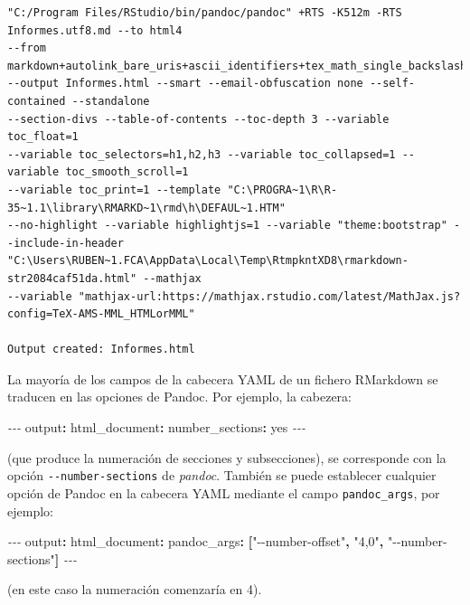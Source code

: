 \documentclass[
]{book}
\newenvironment{Shaded}{\begin{snugshade}}{\end{snugshade}}
\newcommand{\AttributeTok}[1]{\textcolor[rgb]{0.77,0.63,0.00}{#1}}
\newcommand{\CharTok}[1]{\textcolor[rgb]{0.31,0.60,0.02}{#1}}
\newcommand{\FunctionTok}[1]{\textcolor[rgb]{0.00,0.00,0.00}{#1}}
\newcommand{\KeywordTok}[1]{\textcolor[rgb]{0.13,0.29,0.53}{\textbf{#1}}}
\newcommand{\PreprocessorTok}[1]{\textcolor[rgb]{0.56,0.35,0.01}{\textit{#1}}}
\newcommand{\StringTok}[1]{\textcolor[rgb]{0.31,0.60,0.02}{#1}}
\theoremstyle{break}
\theoremstyle{nonumberplain}
\begin{document}
\begin{verbatim}
"C:/Program Files/RStudio/bin/pandoc/pandoc" +RTS -K512m -RTS Informes.utf8.md --to html4 
--from markdown+autolink_bare_uris+ascii_identifiers+tex_math_single_backslash 
--output Informes.html --smart --email-obfuscation none --self-contained --standalone 
--section-divs --table-of-contents --toc-depth 3 --variable toc_float=1 
--variable toc_selectors=h1,h2,h3 --variable toc_collapsed=1 --variable toc_smooth_scroll=1 
--variable toc_print=1 --template "C:\PROGRA~1\R\R-35~1.1\library\RMARKD~1\rmd\h\DEFAUL~1.HTM"
--no-highlight --variable highlightjs=1 --variable "theme:bootstrap" --include-in-header
"C:\Users\RUBEN~1.FCA\AppData\Local\Temp\RtmpkntXD8\rmarkdown-str2084caf51da.html" --mathjax 
--variable "mathjax-url:https://mathjax.rstudio.com/latest/MathJax.js?config=TeX-AMS-MML_HTMLorMML"

Output created: Informes.html
\end{verbatim}

La mayoría de los campos de la cabecera YAML de un fichero RMarkdown se traducen en las opciones de Pandoc.
Por ejemplo, la cabezera:

\begin{Shaded}
\begin{Highlighting}[]
\PreprocessorTok{{-}{-}{-}}
\FunctionTok{output}\KeywordTok{:}
\AttributeTok{  }\FunctionTok{html\_document}\KeywordTok{:}
\AttributeTok{    }\FunctionTok{number\_sections}\KeywordTok{:}\AttributeTok{ }\CharTok{yes}\AttributeTok{      }
\PreprocessorTok{{-}{-}{-}}
\end{Highlighting}
\end{Shaded}

(que produce la numeración de secciones y subsecciones),
se corresponde con la opción \texttt{-\/-number-sections} de \emph{pandoc}.
También se puede establecer cualquier opción de Pandoc en la cabecera YAML
mediante el campo \texttt{pandoc\_args}, por ejemplo:

\begin{Shaded}
\begin{Highlighting}[]
\PreprocessorTok{{-}{-}{-}}
\FunctionTok{output}\KeywordTok{:}
\AttributeTok{  }\FunctionTok{html\_document}\KeywordTok{:}\AttributeTok{ }
\AttributeTok{    }\FunctionTok{pandoc\_args}\KeywordTok{:}\AttributeTok{ }\KeywordTok{[}\StringTok{"{-}{-}number{-}offset"}\KeywordTok{,}\AttributeTok{ }\StringTok{"4,0"}\KeywordTok{,}\AttributeTok{ }\StringTok{"{-}{-}number{-}sections"}\KeywordTok{]}\AttributeTok{      }
\PreprocessorTok{{-}{-}{-}}
\end{Highlighting}
\end{Shaded}

(en este caso la numeración comenzaría en 4).

  
\end{document}
